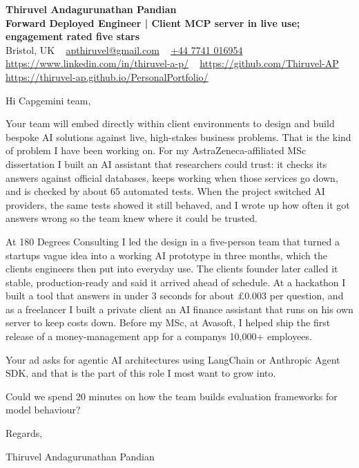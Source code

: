 \documentclass[11pt,a4paper]{article}
\begin{document}
\raggedright
\pagestyle{empty}

\begin{center}
    {\LARGE \color{linkblue} \textbf{Thiruvel Andagurunathan Pandian}}\\[0.2cm]
    {\color{headernavy}\small\textbf{Forward Deployed Engineer | Client MCP server in live use; engagement rated five stars}}\\[0.2cm]
    {\small Bristol, UK\nobreak\ \,\textbar\, \href{mailto:apthiruvel@gmail.com}{apthiruvel@gmail.com}\nobreak\ \,\textbar\, \href{tel:+447741016954}{+44 7741 016954}\nobreak\ \,\textbar\, \href{https://www.linkedin.com/in/thiruvel-a-p/}{https://www.linkedin.com/in/thiruvel-a-p/}\nobreak\ \,\textbar\, \href{https://github.com/Thiruvel-AP}{https://github.com/Thiruvel-AP}\nobreak\ \,\textbar\, \href{https://thiruvel-ap.github.io/PersonalPortfolio/}{https://thiruvel-ap.github.io/PersonalPortfolio/}}

\end{center}

\vspace{0.4cm}

\noindent
Hi Capgemini team,

Your team will embed directly within client environments to design and build bespoke AI solutions against live, high-stakes business problems. That is the kind of problem I have been working on. For my AstraZeneca-affiliated MSc dissertation I built an AI assistant that researchers could trust: it checks its answers against official databases, keeps working when those services go down, and is checked by about 65 automated tests. When the project switched AI providers, the same tests showed it still behaved, and I wrote up how often it got answers wrong so the team knew where it could be trusted.

At 180 Degrees Consulting I led the design in a five-person team that turned a startup\textquotesingle{}s vague idea into a working AI prototype in three months, which the client\textquotesingle{}s engineers then put into everyday use. The client\textquotesingle{}s founder later called it \textquotedbl{}stable, production-ready\textquotedbl{} and said it arrived \textquotedbl{}ahead of schedule\textquotedbl{}. At a hackathon I built a tool that answers in under 3 seconds for about £0.003 per question, and as a freelancer I built a private client an AI finance assistant that runs on his own server to keep costs down. Before my MSc, at Avasoft, I helped ship the first release of a money-management app for a company\textquotesingle{}s 10,000+ employees.

Your ad asks for agentic AI architectures using LangChain or Anthropic Agent SDK, and that is the part of this role I most want to grow into.

Could we spend 20 minutes on how the team builds evaluation frameworks for model behaviour?

\vspace{0.5cm}

Regards,

Thiruvel Andagurunathan Pandian
\end{document}
